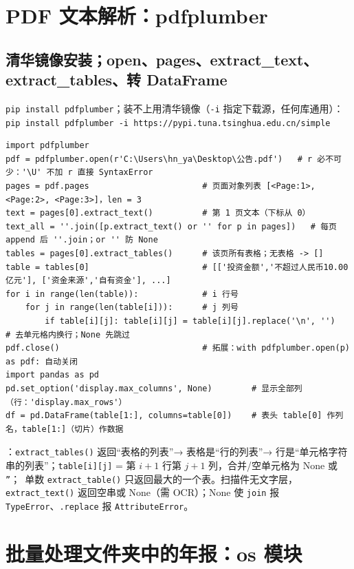 \section{PDF 文本解析：pdfplumber}

\subsection{清华镜像安装；open、pages、extract\_text、extract\_tables、转 DataFrame}
\texttt{pip install pdfplumber}；装不上用清华镜像（\texttt{-i} 指定下载源，任何库通用）：\texttt{pip install pdfplumber -i https://pypi.tuna.tsinghua.edu.cn/simple}
\begin{lstlisting}[style=pyD07]
import pdfplumber
pdf = pdfplumber.open(r'C:\Users\hn_ya\Desktop\公告.pdf')   # r 必不可少：'\U' 不加 r 直接 SyntaxError
pages = pdf.pages                       # 页面对象列表 [<Page:1>, <Page:2>, <Page:3>]，len = 3
text = pages[0].extract_text()          # 第 1 页文本（下标从 0）
text_all = ''.join([p.extract_text() or '' for p in pages])   # 每页 append 后 ''.join；or '' 防 None
tables = pages[0].extract_tables()      # 该页所有表格；无表格 -> []
table = tables[0]                       # [['投资金额','不超过人民币10.00亿元'], ['资金来源','自有资金'], ...]
for i in range(len(table)):             # i 行号
    for j in range(len(table[i])):      # j 列号
        if table[i][j]: table[i][j] = table[i][j].replace('\n', '')   # 去单元格内换行；None 先跳过
pdf.close()                             # 拓展：with pdfplumber.open(p) as pdf: 自动关闭
import pandas as pd
pd.set_option('display.max_columns', None)        # 显示全部列（行：'display.max_rows'）
df = pd.DataFrame(table[1:], columns=table[0])    # 表头 table[0] 作列名，table[1:]（切片）作数据
\end{lstlisting}
：\texttt{extract\_tables()} 返回“表格的列表”→ 表格是“行的列表”→ 行是“单元格字符串的列表”；\texttt{table[i][j]} = 第 $i{+}1$ 行第 $j{+}1$ 列，合并/空单元格为 None 或 \texttt{''}；\tagext\ 单数 \texttt{extract\_table()} 只返回最大的一个表。扫描件无文字层，\texttt{extract\_text()} 返回空串或 None（需 OCR）；None 使 \texttt{join} 报 \texttt{TypeError}、\texttt{.replace} 报 \texttt{AttributeError}。

\section{批量处理文件夹中的年报：os 模块}

